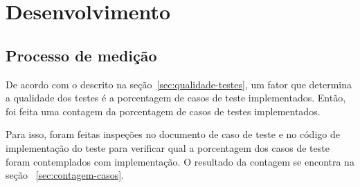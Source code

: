 \chapter[Desenvolvimento ]{Desenvolvimento}

\section{Processo de medição}
De acordo com o descrito na seção~\ref{sec:qualidade-testes}, um fator que determina a qualidade dos testes é a porcentagem de casos de teste implementados. Então, foi feita uma contagem da porcentagem de casos de testes implementados. 

Para isso, foram feitas inspeções no documento de caso de teste e no código de implementação do teste  para verificar qual a porcentagem dos casos de teste foram contemplados com implementação. O resultado da contagem se encontra na seção ~\ref{sec:contagem-casos}.


